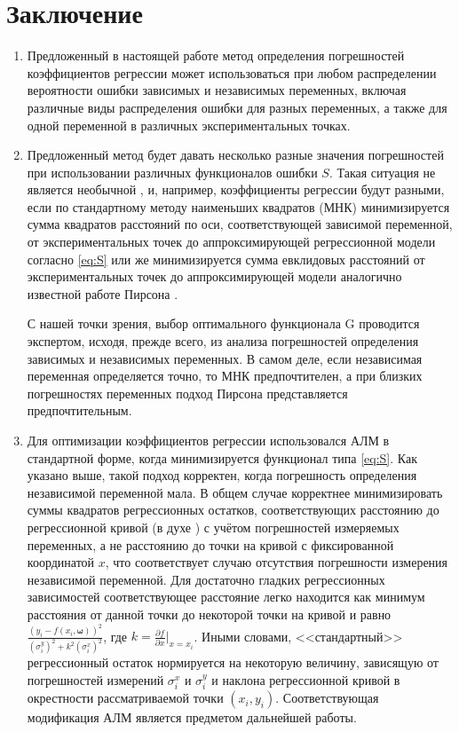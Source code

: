 \documentclass[11pt,a4paper]{article}
\theoremstyle{definition}
\begin{document}
\section{Заключение}

\begin{enumerate}
  \item Предложенный в настоящей работе метод определения погрешностей
	коэффициентов регрессии может использоваться при любом распределении
    вероятности ошибки зависимых и независимых переменных,
    включая различные виды распределения ошибки для разных переменных, а
    также для одной переменной в различных экспериментальных точках.
  \item Предложенный метод будет давать несколько разные значения погрешностей при
    использовании различных функционалов ошибки $S$. Такая ситуация
	не является необычной \cite{Rudoy13}, и, например, коэффициенты регрессии будут разными,
    если по стандартному методу наименьших квадратов (МНК) минимизируется
    сумма квадратов расстояний по оси, соответствующей зависимой переменной, от экспериментальных точек до
	аппроксимирующей регрессионной модели согласно \eqref{eq:S} или же минимизируется сумма
    евклидовых расстояний от экспериментальных точек до аппроксимирующей
	модели аналогично известной работе Пирсона \cite{pearson1901}.

	С нашей точки зрения, выбор оптимального функционала G
	проводится экспертом, исходя, прежде всего, из анализа погрешностей
	определения зависимых и независимых переменных. В самом деле, если
	независимая переменная определяется точно, то МНК предпочтителен, а при
	близких погрешностях переменных подход Пирсона представляется
	предпочтительным.
  \item Для оптимизации коэффициентов регрессии использовался
	АЛМ в стандартной форме, когда минимизируется функционал типа \eqref{eq:S}. Как
	указано выше, такой подход корректен, когда погрешность определения независимой
	переменной мала. В общем случае корректнее минимизировать суммы квадратов регрессионных остатков,
	соответствующих расстоянию до регрессионной кривой (в духе \cite{pearson1901}) с учётом
	погрешностей измеряемых переменных, а не расстоянию до точки на кривой
	с фиксированной координатой $x$, что соответствует случаю отсутствия погрешности
	измерения независимой переменной. Для достаточно гладких регрессионных
	зависимостей соответствующее расстояние легко находится как минимум
	расстояния от данной точки до некоторой точки на кривой и равно
	$\frac{(y_i - f(x_i, \boldsymbol{\omega}))^2}{(\sigma^y_i)^2 + k^2 (\sigma^x_i)^2}$,
	где $k = \frac{\partial f}{\partial x} |_{x = x_i}$. Иными словами,
	<<стандартный>> регрессионный остаток нормируется на некоторую величину,
	зависящую от погрешностей измерений $\sigma^x_i$ и $\sigma^y_i$ и
	наклона регрессионной кривой в окрестности рассматриваемой точки $(x_i, y_i)$.
	Соответствующая модификация АЛМ является предметом дальнейшей работы.


\end{enumerate}
\end{document}
